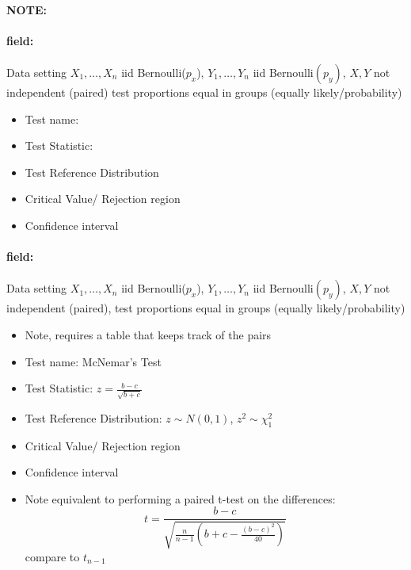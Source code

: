 \documentclass[12pt]{article}
\newenvironment{note}{\paragraph{NOTE:}}{}
\newenvironment{field}{\paragraph{field:}}{}
\begin{document}
\begin{note}
  \begin{field}
  Data setting $X_1, \ldots , X_n$ iid Bernoulli($p_x$), $Y_1, \ldots, Y_n$ iid Bernoulli$(p_y)$, $X,Y$ not independent (paired) test proportions equal in groups (equally likely/probability)
  \begin{itemize}
    \item Test name:
    \item Test Statistic:
    \item Test Reference Distribution
    \item Critical Value/ Rejection region
    \item Confidence interval
  \end{itemize}
\end{field}
\begin{field}
Data setting $X_1, \ldots , X_n$ iid Bernoulli($p_x$), $Y_1, \ldots, Y_n$ iid Bernoulli$(p_y)$, $X,Y$ not independent (paired), test proportions equal in groups (equally likely/probability)
\begin{itemize}
  \item Note, requires a table that keeps track of the pairs
  \item Test name: McNemar's Test
  \item Test Statistic: $z = \frac{b-c}{\sqrt{b+c}}$
  \item Test Reference Distribution: $z \sim N(0,1)$, $z^2 \sim \chi_1^2$
  \item Critical Value/ Rejection region
  \item Confidence interval
  \item Note equivalent to performing a paired t-test on the differences:
  $$ t = \frac{b-c}{\sqrt{\frac{n}{n-1}(b + c - \frac{(b-c)^2}{40})}} $$ compare to $t_{n-1}$
\end{itemize}
\end{field}
\end{note}
\end{document}
